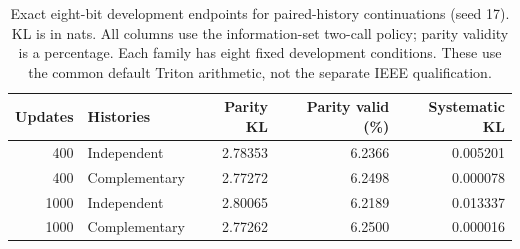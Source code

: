 \begin{table}[ht]
\centering\small
\caption{Exact eight-bit development endpoints for paired-history continuations (seed 17). KL is in nats. All columns use the information-set two-call policy; parity validity is a percentage. Each family has eight fixed development conditions. These use the common default Triton arithmetic, not the separate IEEE qualification.}
\label{tab:pairedhistory}
\begin{tabular}{rlrrr}
\toprule
Updates & Histories & Parity KL & Parity valid (\%) & Systematic KL \\
\midrule
400 & Independent & 2.78353 & 6.2366 & 0.005201 \\
400 & Complementary & 2.77272 & 6.2498 & 0.000078 \\
1000 & Independent & 2.80065 & 6.2189 & 0.013337 \\
1000 & Complementary & 2.77262 & 6.2500 & 0.000016 \\
\bottomrule
\end{tabular}
\end{table}
